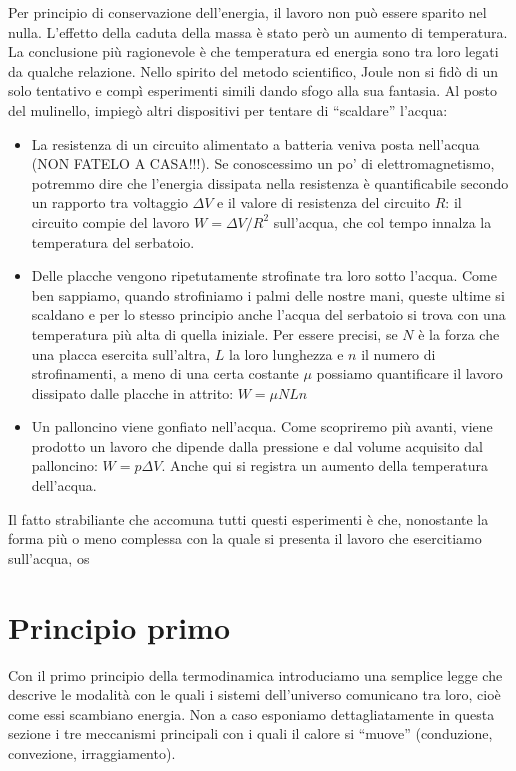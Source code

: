 \noindent Per principio di conservazione dell'energia, il lavoro non
può essere sparito nel nulla. L'effetto della caduta della massa è stato però un aumento di temperatura.
La conclusione più ragionevole è che temperatura ed energia sono tra
loro legati da qualche relazione. Nello spirito del metodo scientifico,
Joule non si fidò di un solo tentativo e compì esperimenti simili
dando sfogo alla sua fantasia. Al posto del mulinello, impiegò altri
dispositivi per tentare di ``scaldare'' l'acqua:
\begin{itemize}
    \item La resistenza di un circuito alimentato a batteria veniva posta
    nell'acqua (NON FATELO A CASA!!!). Se conoscessimo un po' di elettromagnetismo,
    potremmo dire che l'energia dissipata nella resistenza è quantificabile
    secondo un rapporto tra voltaggio $\Delta V$ e il valore di resistenza del circuito
    $R$: il circuito
    compie del lavoro $W = \Delta V / R^2$ sull'acqua, che col tempo
    innalza la temperatura del serbatoio.

    \item Delle placche vengono ripetutamente strofinate tra loro sotto
    l'acqua. Come ben sappiamo, quando strofiniamo i palmi delle nostre
    mani, queste ultime si scaldano e per lo stesso principio anche l'acqua
    del serbatoio si trova con una temperatura più alta di quella iniziale.
    Per essere precisi, se $N$ è la forza che una placca esercita sull'altra,
    $L$ la loro lunghezza e $n$ il numero di strofinamenti, a meno di una
    certa costante $\mu$ possiamo quantificare il lavoro dissipato dalle
    placche in attrito: $W = \mu N L n$

    \item Un palloncino viene gonfiato nell'acqua. Come scopriremo più
    avanti, viene prodotto un lavoro che dipende dalla pressione e dal
    volume acquisito dal palloncino: $W = p \Delta V$. Anche qui si
    registra un aumento della temperatura dell'acqua.
\end{itemize}

Il fatto strabiliante che accomuna tutti questi esperimenti è che,
nonostante la forma più o meno complessa con la quale si presenta il
lavoro che esercitiamo sull'acqua, os




\section{Principio primo}
Con il primo principio della termodinamica introduciamo una semplice
legge che descrive le modalità con le quali i sistemi dell'universo
comunicano tra loro, cioè come essi scambiano energia. Non a caso
esponiamo dettagliatamente in questa sezione i tre meccanismi
principali con i quali il calore si ``muove'' (conduzione, convezione,
irraggiamento).



